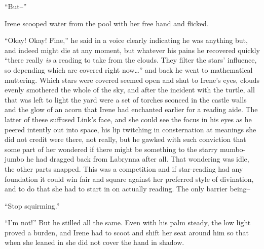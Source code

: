 \documentclass[../FGP.tex]{subfiles}
\renewcommand\footnote[1]{}
\begin{document}
\begin{fragment}
``But--'' 

Irene scooped water from the pool with her free hand and flicked. 

``Okay! Okay! Fine,'' he said in a voice clearly indicating he was anything but, and indeed might die at any moment, but whatever his pains he recovered quickly ``there really \emph{is} a reading to take from the clouds. They filter the stars' influence, so depending which are covered right now\ldots'' and back he went to mathematical muttering. Which stars were covered seemed open and shut to Irene's eyes, clouds evenly smothered the whole of the sky, and after the incident with the turtle, all that was left to light the yard were a set of torches sconced in the castle walls and the glow of an acorn that Irene had enchanted earlier for a reading aide. The latter of these suffused Link's face, and she could see the focus in his eyes as he peered intently out into space, his lip twitching in consternation at meanings she did not credit were there, not really, but he gawked with such conviction that some part of her wondered if there might be something to the starry mumbo-jumbo he had dragged back from Labrynna after all. That wondering was idle, the other parts snapped. This was a competition and if star-reading had any foundation it could win fair and square against her preferred style of divination,\footnote{viz., ``literally anything else.''} and to do that she had to start in on actually reading. The only barrier being--
 
 ``Stop squirming.''

 ``I'm not!'' But he stilled all the same.\reversemarginpar{} Even with his palm steady, the low light proved a burden, and Irene had to scoot and shift her seat around him so that when she leaned in she did not cover the hand in shadow.


\end{fragment}
\end{document}
